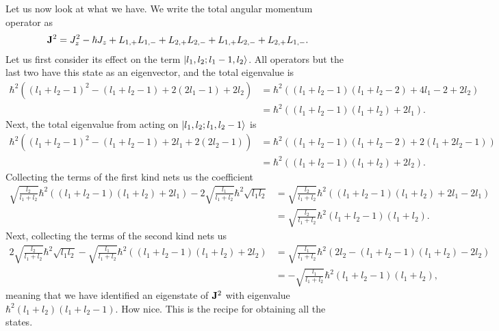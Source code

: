 Let us now look at what we have. We write the total angular momentum operator as
\begin{align*}
	\vb{J}^{2} = J_{z}^{2} - \hbar J_{z} + L_{1, +}L_{1, -} + L_{2, +}L_{2, -} + L_{1, +}L_{2, -} + L_{2, +}L_{1, -}.
\end{align*}
Let us first consider its effect on the term $\ket{l_{1}, l_{2}; l_{1} - 1, l_{2}}$. All operators but the last two have this state as an eigenvector, and the total eigenvalue is
\begin{align*}
	\hbar^{2}\left((l_{1} + l_{2} - 1)^{2} - (l_{1} + l_{2} - 1) + 2(2l_{1} - 1) + 2l_{2}\right) &= \hbar^{2}\left((l_{1} + l_{2} - 1)(l_{1} + l_{2} - 2) + 4l_{1} - 2 + 2l_{2}\right) \\
	&= \hbar^{2}\left((l_{1} + l_{2} - 1)(l_{1} + l_{2}) + 2l_{1}\right).
\end{align*}
Next, the total eigenvalue from acting on $\ket{l_{1}, l_{2}; l_{1}, l_{2} - 1}$ is
\begin{align*}
	\hbar^{2}\left((l_{1} + l_{2} - 1)^{2} - (l_{1} + l_{2} - 1) + 2l_{1} + 2(2l_{2} - 1)\right) &= \hbar^{2}\left((l_{1} + l_{2} - 1)(l_{1} + l_{2} - 2) + 2(l_{1} + 2l_{2} - 1)\right) \\
	&= \hbar^{2}\left((l_{1} + l_{2} - 1)(l_{1} + l_{2}) + 2l_{2}\right).
\end{align*}
Collecting the terms of the first kind nets us the coefficient
\begin{align*}
	\sqrt{\frac{l_{2}}{l_{1} + l_{2}}}\hbar^{2}\left((l_{1} + l_{2} - 1)(l_{1} + l_{2}) + 2l_{1}\right) - 2\sqrt{\frac{l_{1}}{l_{1} + l_{2}}}\hbar^{2}\sqrt{l_{1}l_{2}} &= \sqrt{\frac{l_{2}}{l_{1} + l_{2}}}\hbar^{2}\left((l_{1} + l_{2} - 1)(l_{1} + l_{2}) + 2l_{1} - 2l_{1}\right) \\
	                                                                              &= \sqrt{\frac{l_{2}}{l_{1} + l_{2}}}\hbar^{2}(l_{1} + l_{2} - 1)(l_{1} + l_{2}).
\end{align*}
Next, collecting the terms of the second kind nets us
\begin{align*}
	2\sqrt{\frac{l_{2}}{l_{1} + l_{2}}}\hbar^{2}\sqrt{l_{1}l_{2}} - \sqrt{\frac{l_{1}}{l_{1} + l_{2}}}\hbar^{2}\left((l_{1} + l_{2} - 1)(l_{1} + l_{2}) + 2l_{2}\right) &= \sqrt{\frac{l_{1}}{l_{1} + l_{2}}}\hbar^{2}\left(2l_{2} - (l_{1} + l_{2} - 1)(l_{1} + l_{2}) - 2l_{2}\right) \\
	                                                                         &= -\sqrt{\frac{l_{1}}{l_{1} + l_{2}}}\hbar^{2}(l_{1} + l_{2} - 1)(l_{1} + l_{2}),
\end{align*}
meaning that we have identified an eigenstate of $\vb{J}^{2}$ with eigenvalue $\hbar^{2}(l_{1} + l_{2})(l_{1} + l_{2} - 1)$. How nice. This is the recipe for obtaining all the states.

